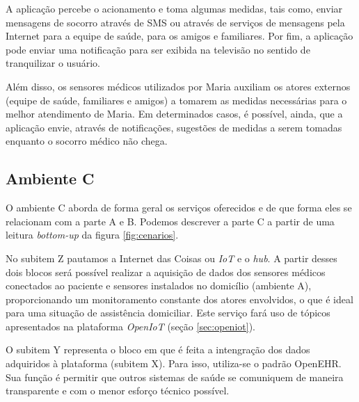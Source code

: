 A aplicação percebe o acionamento e toma algumas medidas, tais como, enviar
mensagens de socorro através de SMS ou através de serviços de mensagens pela
Internet para a equipe de saúde, para os amigos e familiares.  Por fim, a
aplicação pode enviar uma notificação para ser exibida na televisão no sentido
de tranquilizar o usuário.

Além disso, os sensores médicos utilizados por Maria auxiliam os atores
externos (equipe de saúde, familiares e amigos) a tomarem as medidas
necessárias para o melhor atendimento de Maria.  Em determinados casos, é
possível, ainda, que a aplicação envie, através de notificações, sugestões de
medidas a serem tomadas enquanto o socorro médico não chega.

\subsection{Ambiente C} \label{subsec:ambiente-c}

O ambiente C aborda de forma geral os serviços oferecidos e de que forma eles se
relacionam com a parte A e B. Podemos descrever a parte C a partir de uma leitura 
\textit{bottom-up} da figura \ref{fig:cenarios}. 

No subitem Z pautamos a Internet das Coisas ou \textit{IoT} e o \textit{hub}. A
partir desses dois blocos será possível realizar a aquisição de dados dos sensores
médicos conectados ao paciente e sensores instalados no domicílio (ambiente A),
proporcionando um monitoramento constante dos atores envolvidos, o que é ideal
para uma situação de assistência domiciliar. Este serviço fará uso de tópicos
apresentados na plataforma \textit{OpenIoT} (seção \vref{sec:openiot}).

O subitem Y representa o bloco em que é feita a intengração dos dados adquiridos
à plataforma \nextsaude[] (subitem X). Para isso, utiliza-se o padrão OpenEHR. Sua 
função é permitir que outros sistemas de saúde se comuniquem de maneira transparente 
e com o menor esforço técnico possível.


